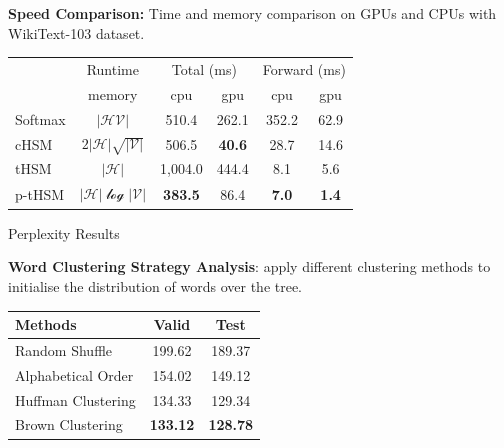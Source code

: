 \documentclass[final,t,unknownkeysallowed]{beamer}
\begin{document}
\begin{frame}{}
\begin{columns}[t]
    

    \begin{column}{.3\linewidth}
    
    
    \textbf{Speed Comparison:} Time and memory comparison on GPUs and CPUs with WikiText-103 dataset.
    \begin{table}
    \setlength{\abovecaptionskip}{0pt}
    \setlength{\abovedisplayskip}{0pt}
    \centering
    \begin{tabular}{lccccc}
    \toprule
    &Runtime &\multicolumn{2}{c}{Total (ms)} & \multicolumn{2}{c}{Forward (ms)}   \\
    \cmidrule(lr){3-4}  \cmidrule(lr){5-6}
	&memory &cpu&gpu &cpu&	gpu \\ \midrule
    Softmax & $\mathcal{|HV|}$ &510.4  &262.1&352.2& 62.9 \\
    cHSM    & $2\mathcal{|H|\sqrt{|V|}}$&506.5  &\textbf{40.6}&28.7&14.6 \\
    tHSM    &$\mathcal{|H|}$&1,004.0 &444.4 & 8.1&  5.6   \\
    p-tHSM  &$\mathcal{|H|\log{|V|}}$ &\textbf{383.5}&	86.4 &\textbf{7.0}&	\textbf{1.4} \\
    \bottomrule
    \end{tabular}
    \end{table}

      \begin{block}{Perplexity Results}

    \textbf{Word Clustering Strategy Analysis}: apply different clustering methods to initialise the distribution of words over the tree.
    \begin{table}
   
    \setlength{\abovecaptionskip}{0pt}
    \setlength{\abovedisplayskip}{0pt}
  \centering
  \begin{tabular}{lcc} \toprule
  Methods   & Valid & Test   \\ \midrule
  Random Shuffle &199.62 &  189.37\\
  Alphabetical Order  & 154.02 & 149.12       \\
  Huffman Clustering   & 134.33 & 129.34      \\
  Brown Clustering  & \textbf{133.12} & \textbf{128.78}\\
\bottomrule
  \end{tabular}
\end{table}


\end{block}
\end{column}
\end{columns}
\end{frame}
\end{document}
